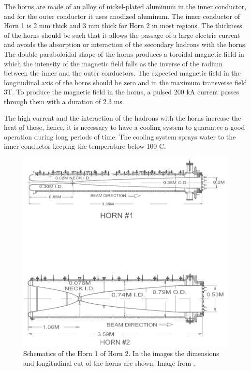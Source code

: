 The horns are made of an alloy of nickel-plated aluminum in the inner conductor, and for the outer conductor it uses anodized aluminum. The inner conductor of Horn 1 is 2 mm thick and 3 mm thick for Horn 2 in most regions. The thickness of the horns should be such that it allows the passage of a large electric current and avoids the absorption or interaction of the secondary hadrons with the horns. The double paraboloidal shape of the horns produces a toroidal magnetic field in which the intensity of the magnetic field falls as the inverse of the radium between the inner and the outer conductors. The expected magnetic field in the longitudinal axis of the horns should be zero and in the maximum transverse field 3T. To produce the magnetic field in the horns, a pulsed 200 kA current passes through them with a duration of 2.3 ms.

The high current and the interaction of the hadrons with the horns increase the heat of those, hence, it is necessary to have a cooling system to guarantee a good operation during long periods of time. The cooling system sprays water to the inner conductor keeping the temperature below 100 C. 

\begin{figure}[!htb]
\centering
\includegraphics[scale=0.33]{Figures/Chapter2/SchematicMagneticHorns.png}
        \caption{Schematics of the Horn 1 of Horn 2. In the images the dimensions and longitudinal cut of the horns are shown. Image from \cite{Numi}.} 
\label{fig:MnvExp:NuMI:NuMIHornsSchematic}
\end{figure}

